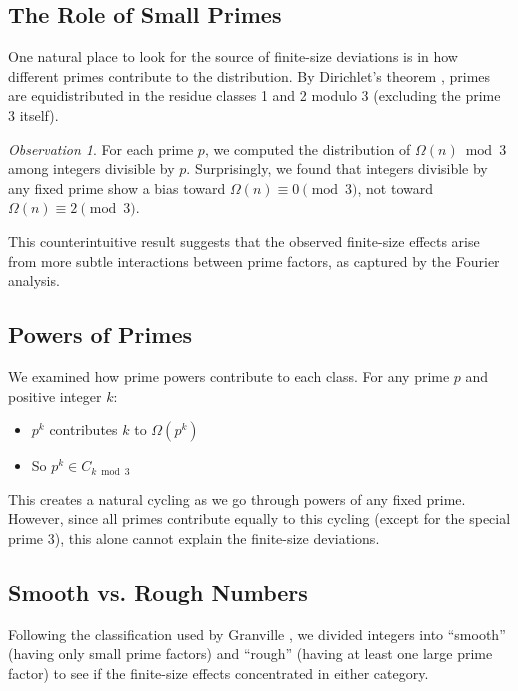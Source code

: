 \documentclass[12pt]{article}
\theoremstyle{definition}
\theoremstyle{remark}
\newtheorem{observation}[theorem]{Observation}
\begin{document}
\subsection{The Role of Small Primes}

One natural place to look for the source of finite-size deviations is in how different primes contribute to the distribution. By Dirichlet's theorem \cite{davenport2000multiplicative}, primes are equidistributed in the residue classes 1 and 2 modulo 3 (excluding the prime 3 itself).

\begin{observation}
For each prime $p$, we computed the distribution of $\Omega(n) \bmod 3$ among integers divisible by $p$. Surprisingly, we found that integers divisible by any fixed prime show a bias toward $\Omega(n) \equiv 0 \pmod{3}$, not toward $\Omega(n) \equiv 2 \pmod{3}$.
\end{observation}

This counterintuitive result suggests that the observed finite-size effects arise from more subtle interactions between prime factors, as captured by the Fourier analysis.

\subsection{Powers of Primes}

We examined how prime powers contribute to each class. For any prime $p$ and positive integer $k$:
\begin{itemize}
\item $p^k$ contributes $k$ to $\Omega(p^k)$
\item So $p^k \in C_{k \bmod 3}$
\end{itemize}

This creates a natural cycling as we go through powers of any fixed prime. However, since all primes contribute equally to this cycling (except for the special prime 3), this alone cannot explain the finite-size deviations.

\subsection{Smooth vs. Rough Numbers}

Following the classification used by Granville \cite{granville2008anatomy}, we divided integers into ``smooth'' (having only small prime factors) and ``rough'' (having at least one large prime factor) to see if the finite-size effects concentrated in either category.
\end{document}

